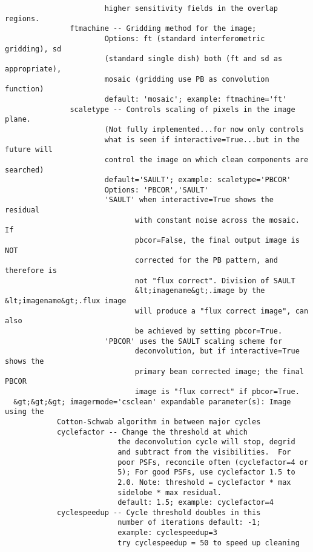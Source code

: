 \begin{verbatim}
                       higher sensitivity fields in the overlap regions.
               ftmachine -- Gridding method for the image;
                       Options: ft (standard interferometric gridding), sd
                       (standard single dish) both (ft and sd as appropriate),
                       mosaic (gridding use PB as convolution function)
                       default: 'mosaic'; example: ftmachine='ft'
               scaletype -- Controls scaling of pixels in the image plane.
                       (Not fully implemented...for now only controls 
                       what is seen if interactive=True...but in the future will 
                       control the image on which clean components are searched)
                       default='SAULT'; example: scaletype='PBCOR'
                       Options: 'PBCOR','SAULT'
                       'SAULT' when interactive=True shows the residual
                              with constant noise across the mosaic. If
                              pbcor=False, the final output image is NOT
                              corrected for the PB pattern, and therefore is
                              not "flux correct". Division of SAULT
                              &lt;imagename&gt;.image by the &lt;imagename&gt;.flux image
                              will produce a "flux correct image", can also
                              be achieved by setting pbcor=True.
                       'PBCOR' uses the SAULT scaling scheme for
                              deconvolution, but if interactive=True shows the
                              primary beam corrected image; the final PBCOR
                              image is "flux correct" if pbcor=True.
  &gt;&gt;&gt; imagermode='csclean' expandable parameter(s): Image using the
            Cotton-Schwab algorithm in between major cycles
            cyclefactor -- Change the threshold at which
                          the deconvolution cycle will stop, degrid
                          and subtract from the visibilities.  For
                          poor PSFs, reconcile often (cyclefactor=4 or
                          5); For good PSFs, use cyclefactor 1.5 to
                          2.0. Note: threshold = cyclefactor * max
                          sidelobe * max residual.
                          default: 1.5; example: cyclefactor=4
            cyclespeedup -- Cycle threshold doubles in this
                          number of iterations default: -1;
                          example: cyclespeedup=3
                          try cyclespeedup = 50 to speed up cleaning 

\end{verbatim}
